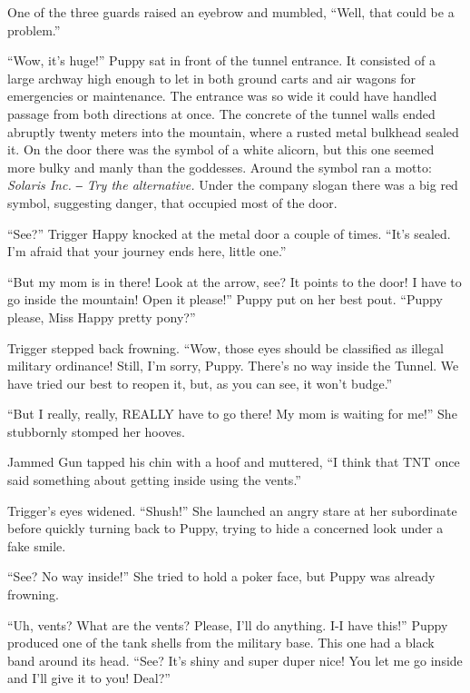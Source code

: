 One of the three guards raised an eyebrow and mumbled, ``Well, that could be a problem.''


\horizonline


``Wow, it's huge!'' Puppy sat in front of the tunnel entrance. It consisted of a large archway high enough to let in both ground carts and air wagons for emergencies or maintenance. The entrance was so wide it could have handled passage from both directions at once. The concrete of the tunnel walls ended abruptly twenty meters into the mountain, where a rusted metal bulkhead sealed it. On the door there was the symbol of a white alicorn, but this one seemed more bulky and manly than the goddesses. Around the symbol ran a motto: \emph{Solaris Inc. ‒ Try the alternative.} Under the company slogan there was a big red symbol, suggesting danger, that occupied most of the door.

``See?'' Trigger Happy knocked at the metal door a couple of times. ``It's sealed. I'm afraid that your journey ends here, little one.''

``But my mom is in there! Look at the arrow, see? It points to the door! I have to go inside the mountain! Open it please!'' Puppy put on her best pout. ``Puppy please, Miss Happy pretty pony?''

Trigger stepped back frowning. ``Wow, those eyes should be classified as illegal military ordinance! Still, I'm sorry, Puppy. There's no way inside the Tunnel. We have tried our best to reopen it, but, as you can see, it won't budge.''

``But I really, really, REALLY have to go there! My mom is waiting for me!'' She stubbornly stomped her hooves.

Jammed Gun tapped his chin with a hoof and muttered, ``I think that TNT once said something about getting inside using the vents.''

Trigger's eyes widened. ``Shush!'' She launched an angry stare at her subordinate before quickly turning back to Puppy, trying to hide a concerned look under a fake smile.

``See? No way inside!'' She tried to hold a poker face, but Puppy was already frowning.

``Uh, vents? What are the vents? Please, I'll do anything. I-I have this!'' Puppy produced one of the tank shells from the military base. This one had a black band around its head. ``See? It's shiny and super duper nice! You let me go inside and I'll give it to you! Deal?''

